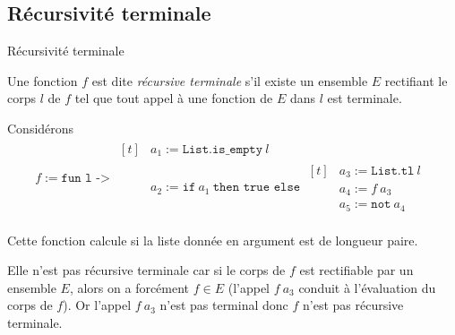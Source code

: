 \subsection{Récursivité terminale}

\begin{definition}
    Récursivité terminale

    Une fonction $f$ est dite \textit{récursive terminale} s'il existe un
    ensemble $E$ rectifiant le corps $l$ de $f$ tel que tout appel à une
    fonction de $E$ dans $l$ est terminale.
\end{definition}

\begin{example}
    Considérons
    \begin{align*}
        f := \texttt{fun l -> }
        \begin{aligned}[t]
             & a_1 := \texttt{List.is\_empty}\ l                                               \\
             & a_2 := \texttt{if}\ a_1\ \texttt{then true else}\ \begin{aligned}[t]
                                                                      & a_3 := \texttt{List.tl}\ l \\
                                                                      & a_4 := f\ a_3              \\
                                                                      & a_5 := \texttt{not}\ a_4
                                                                 \end{aligned}
        \end{aligned}
    \end{align*}

    Cette fonction calcule si la liste donnée en argument est de longueur paire.

    Elle n'est pas récursive terminale car si le corps de $f$ est rectifiable
    par un ensemble $E$, alors on a forcément $f \in E$ (l'appel $f\ a_3$
    conduit à l'évaluation du corps de $f$). Or l'appel $f\ a_3$ n'est pas
    terminal donc $f$ n'est pas récursive terminale.

    \bigbreak


\end{example}

